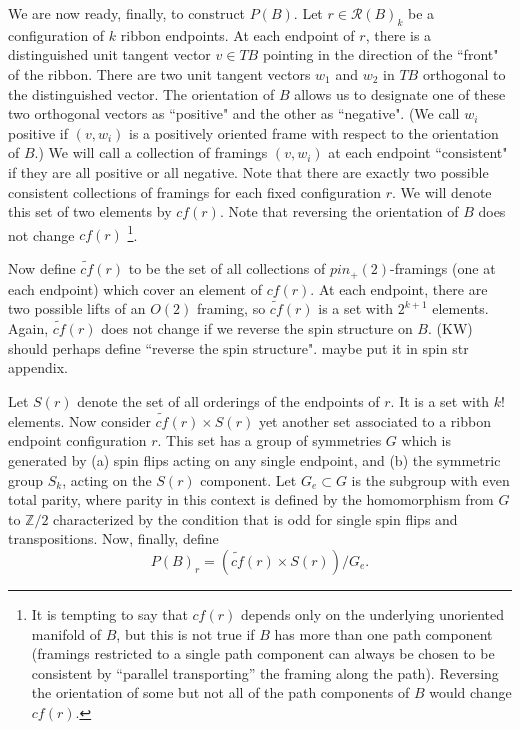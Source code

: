 \documentclass[12pt,a4paper]{article}
\newcommand{\zz}{\mathbb{Z}}
\newcommand{\mcr}{\mathcal{R}}
\newcommand\be            {\begin{equation}}
\newcommand\ee            {\end{equation}}
\newcommand{\kw}[1]{{\color{kwcolor}\footnotesize{(KW) #1}}}
\begin{document}
We are now ready, finally, to construct $P(B)$.
Let $r \in \mcr(B)_k$ be a configuration of $k$ ribbon endpoints.
At each endpoint of $r$, there is a distinguished unit tangent vector $v \in TB$
pointing in the direction of the ``front" of the ribbon.
There are two unit tangent vectors $w_1$ and $w_2$ in $TB$ orthogonal to the distinguished vector.
The orientation of $B$ allows us to designate one of these two orthogonal vectors as ``positive"
and the other as ``negative".
(We call $w_i$ positive if $(v, w_i)$ is a positively oriented frame with respect to the orientation of $B$.)
We will call a collection of framings $(v, w_i)$ at each endpoint ``consistent" if they are all positive
or all negative.
Note that there are exactly two possible consistent collections of framings for each fixed configuration $r$.
We will denote this set of two elements by $cf(r)$.
Note that reversing the orientation of $B$ does not change $cf(r)$
\footnote{It is tempting to say that $cf(r)$ depends only on the underlying unoriented manifold of $B$, but this
is not true if $B$ has more than one path component (framings restricted to a single path component
can always be chosen to be consistent by ``parallel transporting'' the framing along the path).
Reversing the orientation of some but not all of the path components of $B$ would change $cf(r)$.}.

\newcommand{\tcf}{\widetilde{cf}}

Now define $\tcf(r)$ to be the set of all collections of $pin_+(2)$-framings (one at each endpoint)
which cover an element of $cf(r)$.
At each endpoint, there are two possible lifts of an $O(2)$ framing, 
so $\tcf(r)$ is a set with $2^{k+1}$ elements.
Again, $\tcf(r)$ does not change if we reverse the spin structure on $B$.
\kw{should perhaps define ``reverse the spin structure".  maybe put it in spin str appendix.}

Let $S(r)$ denote the set of all orderings of the endpoints of $r$.
It is a set with $k!$ elements.
Now consider $\tcf(r) \times S(r)$ yet another set associated to a ribbon endpoint configuration $r$.
This set has a group of symmetries $G$ which is generated by (a) spin flips acting on any single endpoint, 
and (b) the symmetric group $S_k$, acting on the $S(r)$ component.
Let $G_e \subset G$ is the subgroup with even total parity, where 
parity in this context is defined by the homomorphism from $G$ to $\zz/2$
characterized by the condition that is odd for single spin flips and transpositions.
Now, finally, define
\be
	P(B)_r = (\tcf(r) \times S(r))/G_e .
\ee
\end{document}
